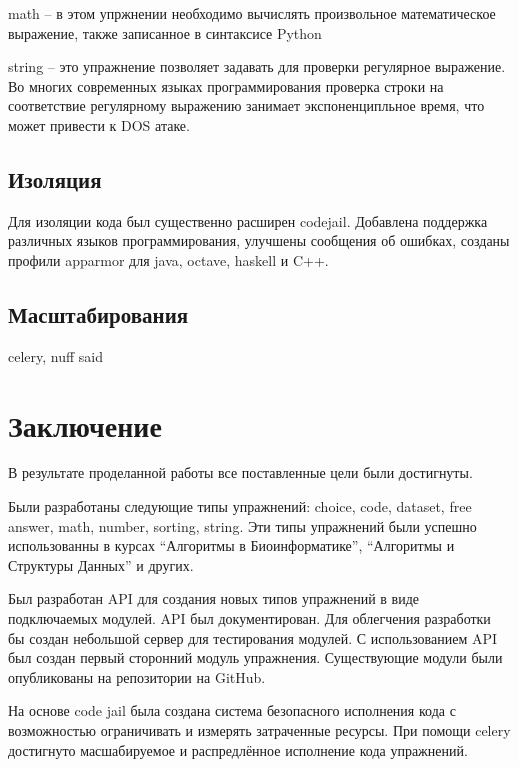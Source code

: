 \documentclass{matmex-diploma-custom}
\begin{document}
math -- в этом упржнении необходимо вычислять произвольное
математическое выражение, также записанное в синтаксисе Python

string -- это упражнение позволяет задавать для проверки регулярное
выражение. Во многих современных языках программирования проверка
строки на соответствие регулярному выражению занимает экспоненципльное
время, что может привести к DOS атаке.

\subsection{Изоляция}

Для изоляции кода был существенно расширен codejail. Добавлена
поддержка различных языков программирования, улучшены сообщения об
ошибках, созданы профили apparmor для java, octave, haskell и C++.

\subsection{Масштабирования}
celery, nuff said

\section*{Заключение}
В результате проделанной работы все поставленные цели были
достигнуты.

Были разработаны следующие типы упражнений: choice, code, dataset,
free answer, math, number, sorting, string. Эти типы упражнений были
успешно использованны в курсах ``Алгоритмы в Биоинформатике'',
``Алгоритмы и Структуры Данных'' и других.

Был разработан API для создания новых типов упражнений в виде
подключаемых модулей. API был документирован. Для облегчения
разработки бы создан небольшой сервер для тестирования модулей. С
использованием API был создан первый сторонний модуль
упражнения. Существующие модули были опубликованы на репозитории на
GitHub.

На основе code jail была создана система безопасного исполнения кода с
возможностью ограничивать и измерять затраченные ресурсы. При помощи
celery достигнуто масшабируемое и распредлённое исполнение кода упражнений.



\end{document}
